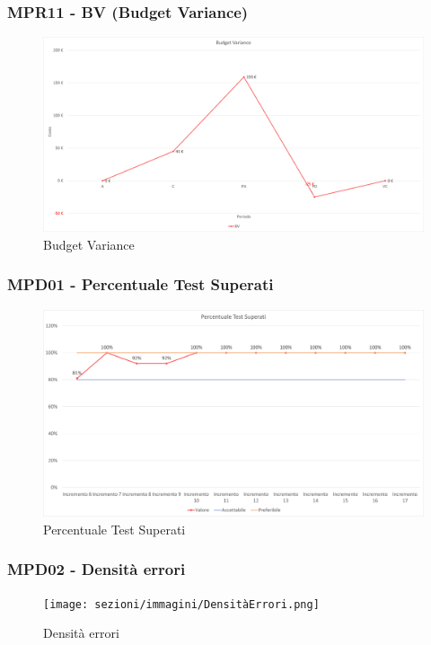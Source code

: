 \subsubsection{MPR11 - BV (Budget Variance)}
\begin{figure}[!ht]
    \caption{Budget Variance}
    \vspace{10px}
    \includegraphics[scale=0.5]{sezioni/immagini/BudgetVariance.png}
    \centering
\end{figure}
\pagebreak
\subsubsection{MPD01 - Percentuale Test Superati}
\begin{figure}[!ht]
    \caption{Percentuale Test Superati}
    \vspace{10px}
    \includegraphics[scale=0.5]{sezioni/immagini/PercentualeTestSuperati.png}
    \centering
\end{figure}
\subsubsection{MPD02 - Densità errori}
\begin{figure}[!ht]
    \caption{Densità errori}
    \vspace{10px}
    \texttt{[image: sezioni/immagini/DensitàErrori.png]}
    \centering
\end{figure}
\pagebreak
